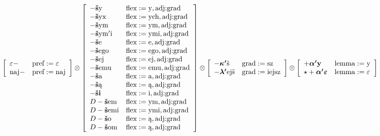 \documentclass{article}
\begin{document}
\begin{scriptsize}\[
\left[\begin{array}{ll}
\varepsilon- & \text{pref}:=\text{$\varepsilon$}\\
\text{naj}- & \text{pref}:=\text{naj}
\end{array}\right] \otimes \left[\begin{array}{ll}
-\text{{\bf š}y} & \text{flex}:=\text{y}, \text{adj:grad}\\
-\text{{\bf š}yx} & \text{flex}:=\text{ych}, \text{adj:grad}\\
-\text{{\bf š}ym} & \text{flex}:=\text{ym}, \text{adj:grad}\\
-\text{{\bf š}ym$'$i} & \text{flex}:=\text{ymi}, \text{adj:grad}\\
-\text{{\bf š}e} & \text{flex}:=\text{e}, \text{adj:grad}\\
-\text{{\bf š}ego} & \text{flex}:=\text{ego}, \text{adj:grad}\\
-\text{{\bf š}ej} & \text{flex}:=\text{ej}, \text{adj:grad}\\
-\text{{\bf š}emu} & \text{flex}:=\text{emu}, \text{adj:grad}\\
-\text{{\bf š}a} & \text{flex}:=\text{a}, \text{adj:grad}\\
-\text{{\bf š}ą} & \text{flex}:=\text{ą}, \text{adj:grad}\\
-\text{{\bf ši}} & \text{flex}:=\text{i}, \text{adj:grad}\\
D-\text{{\bf š}em} & \text{flex}:=\text{ym}, \text{adj:grad}\\
D-\text{{\bf š}emi} & \text{flex}:=\text{ymi}, \text{adj:grad}\\
D-\text{{\bf š}o} & \text{flex}:=\text{ą}, \text{adj:grad}\\
D-\text{{\bf š}om} & \text{flex}:=\text{ą}, \text{adj:grad}
\end{array}\right] \otimes \left[\begin{array}{ll}
-\text{\boldmath$\kappa'$š} & \text{grad}:=\text{sz}\\
-\text{\boldmath$\lambda'$ejš} & \text{grad}:=\text{iejsz}
\end{array}\right] \otimes \left[\begin{array}{ll}
+\text{\boldmath$\alpha'${\bf y}} & \text{lemma}:=\text{y}\\
\star+\text{\boldmath$\alpha'\varepsilon$} & \text{lemma}:=\text{$\varepsilon$}
\end{array}\right]
\]\end{scriptsize}
\end{document}
